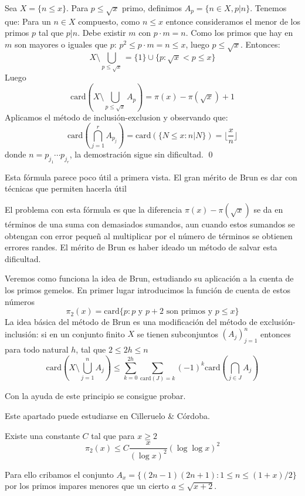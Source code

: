 \documentclass[TAN.tex]{subfiles}
\begin{document}
\begin{dem}
Sea $X=\{n≤x\}$. Para $p≤\sqrt{x}$ primo, definimos $A_p=\{n \in X, p|n\}$.
Tenemos que:
Para un $n \in X$ compuesto, como $n≤x$ entonce consideramos el menor de los primos $p$ tal que $p|n$. Debe existir $m$ con $p\cdot m = n$. Como los primos que hay en $m$ son mayores o iguales que $p$: $p^2 ≤ p\cdot m = n ≤ x$, luego $p≤\sqrt{x}$. Entonces:
\[ X \setminus \bigcup_{p≤\sqrt{x}} = \{1 \} \cup \{p : \sqrt{x} < p ≤ x\} \]
Luego
\[ \text{card}\left(X \setminus \bigcup_{p≤\sqrt{x}} A_p\right) = π(x) - π(\sqrt{x}) + 1 \]
Aplicamos el método de inclusión-exclusion y observando que:
\[ \text{card}\left(\bigcap_{j=1}^r A_{p_j}\right) =\text{card}(\{N≤x : n|N\}) = \lfloor \frac{x}{n} \rfloor\]
donde $n = p_{j_1}\cdots p_{j_r}$, la demostración sigue sin dificultad.
\qed
\end{dem}

Esta fórmula parece poco útil a primera vista. El gran mérito de Brun es dar con técnicas que permiten hacerla útil

El problema con esta fórmula es que la diferencia $π(x)-π(\sqrt{x})$ se da en términos de una suma con demasiados sumandos, aun cuando estos sumandos se obtengan con error pequeñ al multiplicar por el número de términos se obtienen errores randes. El mérito de Brun es haber ideado un método de salvar esta dificultad.

Veremos como funciona la idea de Brun, estudiando su aplicación a la cuenta de los primos gemelos. En primer lugar introducimos la función de cuenta de estos números
\[ π_2(x) = \text{card}\{p : p \text{ y }p+2\text{ son primos y }p≤x\} \]
La idea básica del método de Brun es una modificación del método de exclusión-inclusión: si en un conjunto finito $X$ se tienen subconjuntos $(A_j)_{j=1}^n$ entonces para todo natural $h$, tal que $2≤2h≤n$
\[ \text{card}\left(X \setminus \bigcup_{j=1}^n A_j \right) ≤ \sum_{k=0}^{2h} \sum_{\text{card}(J)=k} (-1)^k \text{card}\left(\bigcap_{j\in J} A_j \right)\]

Con la ayuda de este principio se consigue probar.

Este apartado puede estudiarse en Cilleruelo \& Córdoba.

\begin{teorema}
Existe una constante $C$ tal que para $x ≥ 2$
\[ π_2(x) ≤ C \frac{x}{(\log x)^2} (\log \log x)^2 \]
\end{teorema}
Para ello cribamos el conjunto $A_x = \{(2n-1)(2n+1) : 1 ≤ n ≤ (1+x)/2\}$
por los primos impares menores que un cierto $a ≤ \sqrt{x+2}$.
\end{document}
